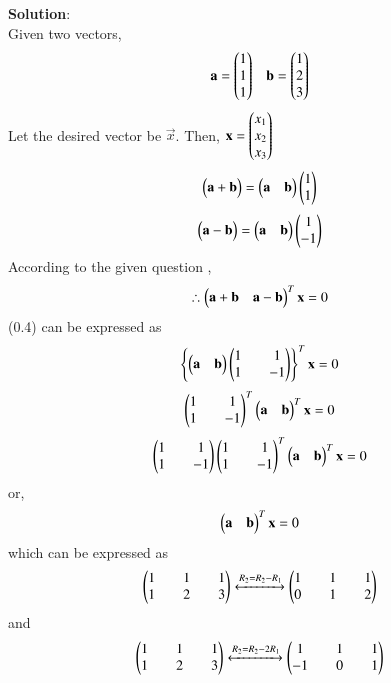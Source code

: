 \documentclass[journal]{IEEEtran}
\begin{document}
\textbf{Solution}: \\
Given two vectors,\\
\begin{align}
    \mathbf{a}=\begin{pmatrix}1\\1\\1\end{pmatrix} \;\;\; \mathbf{b}=\begin{pmatrix}1\\2\\3\end{pmatrix}
\end{align}
Let the desired vector be $\vec{x}$.
Then,
$\mathbf{x}=\begin{pmatrix}x_1 \\
x_2\\
x_3\end{pmatrix}$
\begin{align}
\begin{pmatrix}\mathbf{a}+\mathbf{b}\end{pmatrix}=\begin{pmatrix}\mathbf{a}&\mathbf{b}\end{pmatrix}\begin{pmatrix}1\\1\end{pmatrix}
\end{align}
\begin{align}
\begin{pmatrix}\mathbf{a}-\mathbf{b}\end{pmatrix}=\begin{pmatrix}\mathbf{a}&\mathbf{b}\end{pmatrix}\begin{pmatrix}1\\-1\end{pmatrix}
\end{align}
According to the given question ,
\begin{align}
    \therefore \begin{pmatrix}\mathbf{a}+\mathbf{b}&\mathbf{a}-\mathbf{b}\end{pmatrix}^T\mathbf{x}=0
\end{align}
(0.4) can be expressed as
\begin{align}
    \left\{{\begin{pmatrix}\mathbf{a}&\mathbf{b}\end{pmatrix}\begin{pmatrix}1&&1\\1&&-1\end{pmatrix}}\right\}^T\mathbf{x}=0
    \end{align}
    \begin{align}
       \begin{pmatrix}1&&1\\1&&-1\end{pmatrix}^T \begin{pmatrix}\mathbf{a}&\mathbf{b}\end{pmatrix}^T\mathbf{x}=0
    \end{align}
    \begin{align}
         \begin{pmatrix}1&&1\\1&&-1\end{pmatrix}\begin{pmatrix}1&&1\\1&&-1\end{pmatrix}^T \begin{pmatrix}\mathbf{a}&\mathbf{b}\end{pmatrix}^T\mathbf{x}=0
    \end{align}
    or,
    \begin{align}
        \begin{pmatrix}\mathbf{a}&\mathbf{b}\end{pmatrix}^T\mathbf{x}=0
    \end{align}
which can be expressed as 
\begin{align}
    \begin{pmatrix}1&&1&&1\\1&&2&&3\end{pmatrix}
    \xleftrightarrow{ R_2 = R_2 - R_1}
    \begin{pmatrix}1&&1&&1\\0&&1&&2\end{pmatrix}
    \end{align}
    and
    \begin{align}
     \begin{pmatrix}1&&1&&1\\1&&2&&3\end{pmatrix}
    \xleftrightarrow{ R_2 = R_2 - 2R_1}
    \begin{pmatrix}1&&1&&1\\-1&&0&&1\end{pmatrix}
\end{align}
\end{document}

